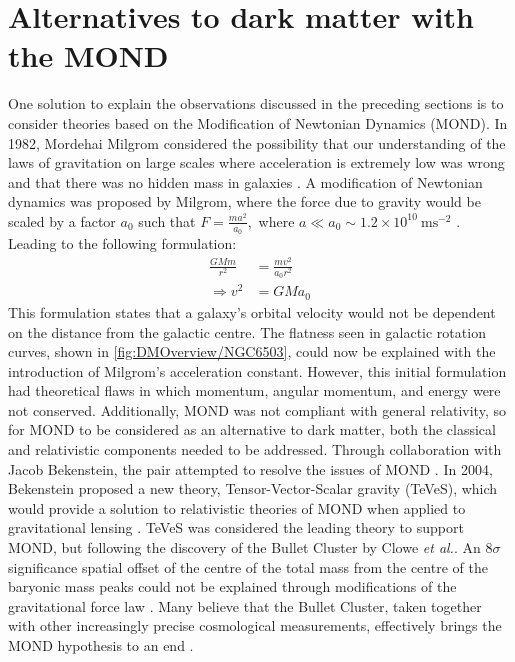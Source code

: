 \section{Alternatives to dark matter with the MOND}\label{sec:DMOverview/MOND}
One solution to explain the observations discussed in the preceding sections is to consider theories based on the Modification of Newtonian Dynamics (MOND). In 1982, Mordehai Milgrom considered the possibility that our understanding of the laws of gravitation on large scales where acceleration is extremely low was wrong and that there was no hidden mass in galaxies \cite{MOND}. A modification of Newtonian dynamics was proposed by Milgrom, where the force due to gravity would be scaled by a factor $a_0$ such that $F=\frac{ma^2}{a_0},$ where $a\ll a_0\sim 1.2\times10^{10}~\text{ms}^{-2}$ \cite{HistoryofDM}. Leading to the following formulation:
\begin{equation}
\begin{split}
    \frac{GMm}{r^2}&=\frac{mv^2}{a_0r^2}\\
    \Rightarrow v^2&=GMa_0
\end{split}
\end{equation}
This formulation states that a galaxy's orbital velocity would not be dependent on the distance from the galactic centre. The flatness seen in galactic rotation curves, shown in \autoref{fig:DMOverview/NGC6503}, could now be explained with the introduction of Milgrom's acceleration constant. However, this initial formulation had theoretical flaws in which momentum, angular momentum, and energy were not conserved. Additionally, MOND was not compliant with general relativity, so for MOND to be considered as an alternative to dark matter, both the classical and relativistic components needed to be addressed.
Through collaboration with Jacob Bekenstein, the pair attempted to resolve the issues of MOND \cite{Bekenstein1984}. In 2004, Bekenstein proposed a new theory, Tensor-Vector-Scalar
gravity (TeVeS), which would provide a solution to relativistic theories of MOND when applied to gravitational lensing \cite{TeVeS}. TeVeS was considered the leading theory to support MOND, but following the discovery of the Bullet Cluster by Clowe \textit{et al.}\cite{Clowe2006}. 
An $8\sigma$ significance spatial offset of the centre of the total mass from the centre of the baryonic mass peaks could not be explained through modifications of the gravitational force law \cite{Clowe2006}. Many believe that the Bullet Cluster, taken together with other increasingly precise cosmological measurements, effectively brings the MOND hypothesis to an end \cite{HistoryofDM}. 

